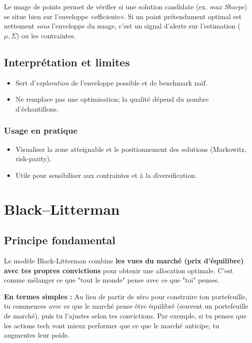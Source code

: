 \documentclass[11pt,a4paper]{article}
\begin{document}
\begin{tcolorbox}[title=Exemple — Rôle pratique de Monte Carlo]
Le nuage de points permet de vérifier si une solution candidate (ex. \emph{max Sharpe}) se situe bien sur l'enveloppe «efficiente». Si un point prétendument optimal est nettement \emph{sous} l'enveloppe du nuage, c'est un signal d'alerte sur l'estimation (\(\mu,\Sigma\)) ou les contraintes.
\end{tcolorbox}

\subsection{Interprétation et limites}
\begin{itemize}
  \item Sert d'\emph{exploration} de l'enveloppe possible et de benchmark naïf.
  \item Ne remplace pas une optimisation; la qualité dépend du nombre d'échantillons.
\end{itemize}

\subsubsection*{Usage en pratique}
\begin{itemize}
  \item Visualiser la zone atteignable et le positionnement des solutions (Markowitz, risk-parity).
  \item Utile pour sensibiliser aux contraintes et à la diversification.
\end{itemize}

\FloatBarrier
\section{Black--Litterman}

\subsection{Principe fondamental}
Le modèle Black-Litterman combine \textbf{les vues du marché (prix d'équilibre) avec tes propres convictions} pour obtenir une allocation optimale. C'est comme mélanger ce que "tout le monde" pense avec ce que "toi" penses.

\textbf{En termes simples :} Au lieu de partir de zéro pour construire ton portefeuille, tu commences avec ce que le marché pense être équilibré (souvent un portefeuille de marché), puis tu l'ajustes selon tes convictions. Par exemple, si tu penses que les actions tech vont mieux performer que ce que le marché anticipe, tu augmentes leur poids.
\end{document}
